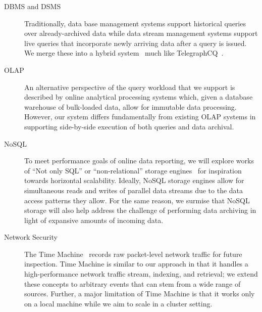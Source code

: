 \documentclass[11pt]{article}
\begin{document}
\begin{description}
\item[DBMS and DSMS]
Traditionally, data base management systems support historical queries over
already-archived data while data stream management systems support live queries
that incorporate newly arriving data after a query is issued. We merge these
into a hybrid system~\cite{Reiss07} much like TelegraphCQ~\cite{Chandrasekaran03}.

\item[OLAP]
An alternative perspective of the query workload that we support is described
by online analytical processing systems which, given a database warehouse of
bulk-loaded data, allow for immutable data processing. However, our system
differs fundamentally from existing OLAP systems in supporting side-by-side
execution of both queries and data archival.

\item[NoSQL]
To meet performance goals of online data reporting, we will explore works of
``Not only SQL'' or ``non-relational'' storage engines~\cite{Cattell10} for
inspiration towards horizontal scalability. Ideally, NoSQL storage engines
allow for simultaneous reads and writes of parallel data streams due to the
data access patterns they allow. For the same reason, we surmise that NoSQL
storage will also help address the challenge of performing data archiving in
light of expansive amounts of incoming data.

\item[Network Security]
The Time Machine~\cite{Maier08} records raw packet-level network
traffic for future inspection. Time Machine is similar to our approach in that
it handles a high-performance network traffic stream, indexing, and retrieval;
we extend these concepts to arbitrary events that can stem from a wide range
of sources. Further, a major limitation of Time Machine is that it works only on
a local machine while we aim to scale in a cluster setting.

\end{description}



\end{document}
